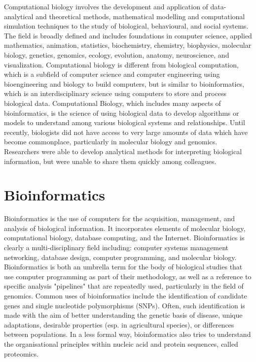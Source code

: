 Computational biology involves the development and application of data-analytical and theoretical methods, mathematical modelling and computational simulation techniques to the study of biological, behavioural, and social systems. The field is broadly defined and includes foundations in computer science, applied mathematics, animation, statistics, biochemistry, chemistry, biophysics, molecular biology, genetics, genomics, ecology, evolution, anatomy, neuroscience, and visualization.
Computational biology is different from biological computation, which is a subfield of computer science and computer engineering using bioengineering and biology to build computers, but is similar to bioinformatics, which is an interdisciplinary science using computers to store and process biological data.
Computational Biology, which includes many aspects of bioinformatics, is the science of using biological data to develop algorithms or models to understand among various biological systems and relationships. Until recently, biologists did not have access to very large amounts of data which have become commonplace, particularly in molecular biology and genomics. Researchers were able to develop analytical methods for interpreting biological information, but were unable to share them quickly among colleagues.
\section{Bioinformatics}
Bioinformatics is the use of computers for the acquisition, management, and analysis of biological information.
It incorporates elements of molecular biology, computational biology, database computing, and the Internet. Bioinformatics is clearly a multi-disciplinary field including: computer systems management networking, database design, computer programming, and molecular biology.
Bioinformatics is both an umbrella term for the body of biological studies that use computer programming as part of their methodology, as well as a reference to specific analysis "pipelines" that are repeatedly used, particularly in the field of genomics. Common uses of bioinformatics include the identification of candidate genes and single nucleotide polymorphisms (SNPs). Often, such identification is made with the aim of better understanding the genetic basis of disease, unique adaptations, desirable properties (esp. in agricultural species), or differences between populations. In a less formal way, bioinformatics also tries to understand the organisational principles within nucleic acid and protein sequences, called proteomics.

